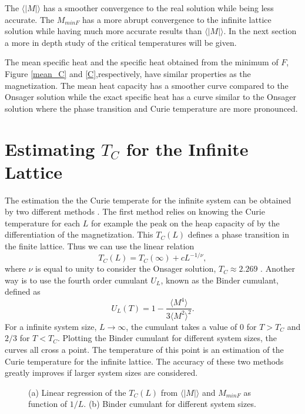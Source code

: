 	The $\langle |M| \rangle$ has a smoother convergence to the real solution while being less accurate. The $M_{minF}$ has a more abrupt convergence to the infinite lattice solution while having much more accurate results than $\langle |M| \rangle$. In the next section  a more in depth study of the critical temperatures will be given.
	
	The mean specific heat and the specific heat obtained from the minimum of $F$, Figure \ref{mean_C} and \ref{C},respectively, have similar properties as the magnetization. The mean heat capacity has a smoother curve compared to the Onsager solution while the exact specific heat has a curve similar to the Onsager solution where the phase transition and Curie temperature are more pronounced.


\section{Estimating $T_C$ for the Infinite Lattice}

	The estimation the the Curie temperate for the infinite system can be obtained by two different methods \cite{Landau_Book}. The first method relies on knowing the Curie temperature for each $L$ for example the peak on the heap capacity of by the differentiation of the magnetization. This $T_C(L)$ defines a phase transition in the finite lattice. Thus we can use the linear relation
\begin{equation}\label{TC_reg_exp}
	T_C(L) = T_C(\infty) + cL^{-1/\nu},
\end{equation}
where $\nu$ is equal to unity to consider the Onsager solution, $T_C\approx2.269$ \cite{Onsager1944}.
Another way is to use the fourth order cumulant $U_L$, known as the Binder cumulant, defined as
\begin{equation}
	U_L(T) = 1 - \frac{\langle M^4 \rangle}{3\langle M^2 \rangle^2}.
\end{equation}
For a infinite system size, $L\rightarrow\infty$, the cumulant takes a value of 0 for $T>T_C$ and $2/3$ for $T<T_C$.
Plotting the Binder cumulant for different system sizes, the curves all cross a point. The temperature of this point is an estimation of the Curie temperature for the infinite lattice. The accuracy of these two methods greatly improves if larger system sizes are considered.

\begin{figure}[h]
	\centering
	\caption{(a) Linear regression of the $T_C(L)$ from $\langle |M| \rangle$ and $M_{minF}$ as function of $1/L$. (b) Binder cumulant for different system sizes.}
	\label{TC_inf}
\end{figure}

